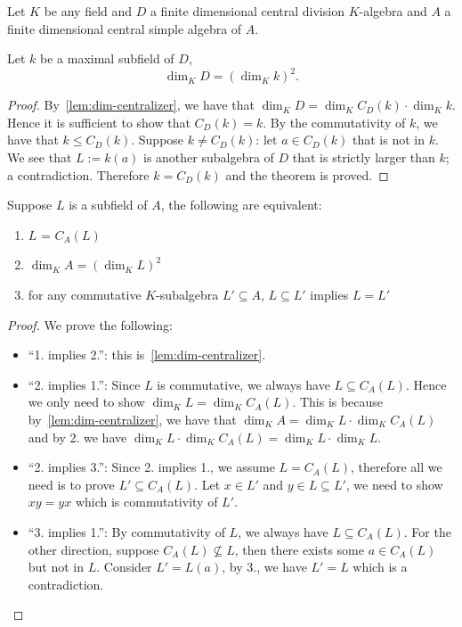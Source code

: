 Let $K$ be any field and $D$ a finite dimensional central division $K$-algebra and $A$ a finite dimensional central simple algebra of $A$.
\begin{lemma}\label{lem:dim-maximal-subfield}
  Let $k$ be a maximal subfield of $D$,
  \[
    \dim_{K}D = {\left(\dim_{K}k\right)}^{2}.
  \]
  \leanok
\end{lemma}

\begin{proof}
  By~\cref{lem:dim-centralizer}, we have that $\dim_{K} D = \dim_{K}C_{D}(k)\cdot \dim_{K}k$. Hence it is sufficient to show that $C_{D}(k) = k$. By the commutativity of $k$, we have that $k \le C_{D}(k)$. Suppose $k \ne C_{D}(k)$: let $a \in C_{D}(k)$ that is not in $k$. We see that $L := k(a)$ is another subalgebra of $D$ that is strictly larger than $k$; a contradiction. Therefore $k = C_{D}(k)$ and the theorem is proved.
\end{proof}

\begin{lemma}\label{lem:tfae-subfield}
  Suppose $L$ is a subfield of $A$, the following are equivalent:
  \begin{enumerate}
    \item $L$ = $C_{A}(L)$
    \item $\dim_{K}A = {\left(\dim_{K}L\right)}^{2}$
    \item for any commutative $K$-subalgebra $L' \subseteq A$, $L \subseteq L'$ implies $L = L'$
  \end{enumerate}
  \leanok
\end{lemma}
\begin{proof}
  We prove the following:
  \begin{itemize}
    \item ``1. implies 2.'': this is~\cref{lem:dim-centralizer}.
    \item ``2. implies 1.'': Since $L$ is commutative, we always have $L \subseteq C_{A}(L)$. Hence we only need to show $\dim_{K}L = \dim_{K}C_{A}(L)$. This is because by~\cref{lem:dim-centralizer}, we have that $\dim_{K}A = \dim_{K}L\cdot \dim_{K}C_{A}(L)$ and by 2. we have $\dim_{K}L\cdot \dim_{K}C_{A}(L)= \dim_{K}L\cdot \dim_{K}L$.
    \item ``2. implies 3.'': Since 2. implies 1., we assume $L = C_{A}(L)$, therefore all we need is to prove $L' \subseteq C_{A}(L)$. Let $x \in L'$ and $y \in L \subseteq L'$, we need to show $xy = yx$ which is commutativity of $L'$.
    \item ``3. implies 1.'': By commutativity of $L$, we always have $L \subseteq C_{A}(L)$. For the other direction, suppose $C_{A}(L)\not\subseteq L$, then there exists some $a \in C_{A}(L)$ but not in $L$. Consider $L' = L(a)$, by 3., we have $L' = L$ which is a contradiction.
  \end{itemize}
\end{proof}

